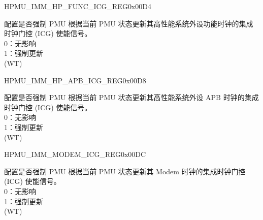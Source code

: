 \begin{register}{H}{PMU\_IMM\_HP\_FUNC\_ICG\_REG}{0x00D4}\label{regdesc:PMUIMMHPFUNCICGREG}
%
%
\regnewline%
\begin{regdesc}\begin{reglist}
\label{fielddesc:PMUUPDATEDIGICGFUNCEN}\item [PMU\_UPDATE\_DIG\_ICG\_FUNC\_EN] 配置是否强制 PMU 根据当前 PMU 状态更新其高性能系统外设功能时钟的集成时钟门控 (ICG) 使能信号。\\
0：无影响 \\
1：强制更新 \\
(WT)
\end{reglist}\end{regdesc}
\end{register}


\begin{register}{H}{PMU\_IMM\_HP\_APB\_ICG\_REG}{0x00D8}\label{regdesc:PMUIMMHPAPBICGREG}
%
%
\regnewline%
\begin{regdesc}\begin{reglist}
\label{fielddesc:PMUUPDATEDIGICGAPBEN}\item [PMU\_UPDATE\_DIG\_ICG\_APB\_EN] 配置是否强制 PMU 根据当前 PMU 状态更新其高性能系统外设 APB 时钟的集成时钟门控 (ICG) 使能信号。\\
0：无影响 \\
1：强制更新 \\
(WT)
\end{reglist}\end{regdesc}
\end{register}


\begin{register}{H}{PMU\_IMM\_MODEM\_ICG\_REG}{0x00DC}\label{regdesc:PMUIMMMODEMICGREG}
%
%
\regnewline%
\begin{regdesc}\begin{reglist}
\label{fielddesc:PMUUPDATEDIGICGMODEMEN}\item [PMU\_UPDATE\_DIG\_ICG\_MODEM\_EN] 配置是否强制 PMU 根据当前 PMU 状态更新其 Modem 时钟的集成时钟门控 (ICG) 使能信号。\\
0：无影响 \\
1：强制更新 \\
(WT)
\end{reglist}\end{regdesc}
\end{register}


